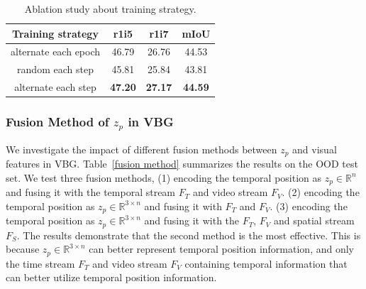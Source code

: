 \begin{table}
	\centering
	\renewcommand{\arraystretch}{1}
	\setlength{\tabcolsep}{2mm}
	\begin{tabular}{c c c c}
		\toprule
		Training strategy & r1i5 & r1i7 & mIoU \\
		\midrule
		alternate each epoch & 46.79 & 26.76 & 44.53 \\
		
		random each step & 45.81 & 25.84 & 43.81 \\
		
		alternate each step & {\bf 47.20} & {\bf 27.17} & {\bf 44.59}\\
		
		\bottomrule
	\end{tabular}
	\caption{Ablation study about training strategy.}
	\label{Training strategy}
\end{table}



\subsubsection{Fusion Method of $z_p$ in VBG}
We investigate the impact of different fusion methods between $z_p$ and visual features in VBG. 
Table~\ref{fusion method} summarizes the results on the OOD test set.
We test three fusion methods, 
(1) encoding the temporal position as $z_p \in \mathbb{R}^{n}$ and fusing it with the temporal stream $F_T$ and video stream $F_V$.
(2) encoding the temporal position as $z_p \in \mathbb{R}^{3 \times n}$ and fusing it with $F_T$ and $F_V$.
(3) encoding the temporal position as $z_p \in \mathbb{R}^{3 \times n}$ and fusing it with the $F_T$, $F_V$ and spatial stream $F_S$. 
The results demonstrate that the second method is the most effective.
This is because $z_p \in \mathbb{R}^{3 \times n}$ can better represent temporal position information, and only the time stream $F_T$ and video stream $F_V$ containing temporal information that can better utilize temporal position information.


